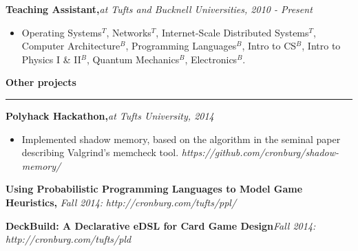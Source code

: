 \documentclass{article}
\begin{document}
\begin{minipage}{\linewidth}
{\bf Teaching Assistant,}{\it at Tufts and Bucknell Universities, 2010 - Present}\\[-.4cm]
\begin{itemize}
\item Operating Systems$^T$, Networks$^T$, Internet-Scale Distributed Systems$^T$,
Computer Architecture$^B$, Programming Languages$^B$, Intro to CS$^B$, Intro to
Physics I \& II$^B$, Quantum Mechanics$^B$, Electronics$^B$.
\end{itemize}
\end{minipage}

{\large\bf Other projects}\\[-.3cm]
\rule{\linewidth}{.5pt}
\begin{minipage}{\linewidth}
{\bf Polyhack Hackathon,}{\it at Tufts University, 2014}\\[-.4cm]
\begin{itemize}
\item Implemented shadow memory, based on the algorithm in the seminal paper
  describing Valgrind's memcheck tool. {\it https://github.com/cronburg/shadow-memory/}
\end{itemize}

{\bf Using Probabilistic Programming Languages to Model Game Heuristics,}{\it
Fall 2014:} {\it http://cronburg.com/tufts/ppl/}

{\bf DeckBuild: A Declarative eDSL for Card Game Design}{\it Fall 2014:} {\it
http://cronburg.com/tufts/pld}



\end{minipage}
\end{document}
